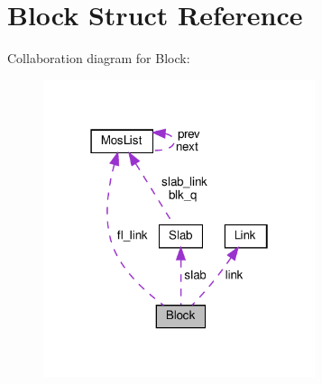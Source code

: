 \hypertarget{structBlock}{}\section{Block Struct Reference}
\label{structBlock}


Collaboration diagram for Block\+:\nopagebreak
\begin{figure}[H]
\begin{center}
\leavevmode
\includegraphics[width=226pt]{structBlock__coll__graph}
\end{center}
\end{figure}
